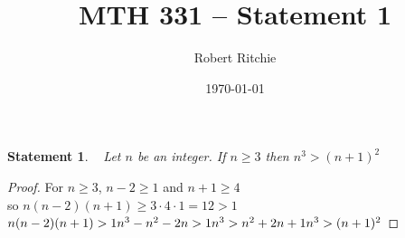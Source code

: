 \documentclass[11pt]{article}
\newtheorem{statement}{Statement}%
\begin{document}
\author{Robert Ritchie}
\title{MTH 331 -- Statement 1} 
\date{\today}

\maketitle

\begin{statement}~
Let $n$ be an integer. If $n\geq3$ then $n^3>(n+1)^2$
\end{statement}

\begin{proof}
For $n\geq3$, $n-2\geq1$ and $n+1\geq4$\\
so $n(n-2)(n+1)\geq3\cdot4\cdot1=12>1$\\
$n(n-2)(n+1)>1\\ n^3-n^2-2n>1\\ n^3>n^2+2n+1\\ n^3>(n+1)^2$


\end{proof}
\end{document}
